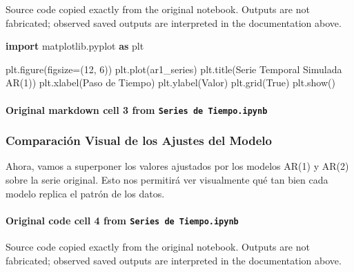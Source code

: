 \documentclass[
  11pt,
]{article}
\newenvironment{Shaded}{}{}
\newcommand{\DecValTok}[1]{\textcolor[rgb]{0.25,0.63,0.44}{#1}}
\newcommand{\ImportTok}[1]{\textcolor[rgb]{0.00,0.50,0.00}{\textbf{#1}}}
\newcommand{\NormalTok}[1]{#1}
\newcommand{\OperatorTok}[1]{\textcolor[rgb]{0.40,0.40,0.40}{#1}}
\newcommand{\StringTok}[1]{\textcolor[rgb]{0.25,0.44,0.63}{#1}}
\newcommand{\VariableTok}[1]{\textcolor[rgb]{0.10,0.09,0.49}{#1}}
\begin{document}
Source code copied exactly from the original notebook. Outputs are not fabricated; observed saved outputs are interpreted in the documentation above.

\begin{Shaded}
\begin{Highlighting}[]
\ImportTok{import}\NormalTok{ matplotlib.pyplot }\ImportTok{as}\NormalTok{ plt}

\NormalTok{plt.figure(figsize}\OperatorTok{=}\NormalTok{(}\DecValTok{12}\NormalTok{, }\DecValTok{6}\NormalTok{))}
\NormalTok{plt.plot(ar1\_series)}
\NormalTok{plt.title(}\StringTok{\textquotesingle{}Serie Temporal Simulada AR(1)\textquotesingle{}}\NormalTok{)}
\NormalTok{plt.xlabel(}\StringTok{\textquotesingle{}Paso de Tiempo\textquotesingle{}}\NormalTok{)}
\NormalTok{plt.ylabel(}\StringTok{\textquotesingle{}Valor\textquotesingle{}}\NormalTok{)}
\NormalTok{plt.grid(}\VariableTok{True}\NormalTok{)}
\NormalTok{plt.show()}
\end{Highlighting}
\end{Shaded}

\paragraph{\texorpdfstring{Original markdown cell 3 from \texttt{Series\ de\ Tiempo.ipynb}}{Original markdown cell 3 from Series de Tiempo.ipynb}}\label{original-markdown-cell-3-from-series-de-tiempoipynb}

\subsubsection{Comparación Visual de los Ajustes del Modelo}\label{comparaciuxf3n-visual-de-los-ajustes-del-modelo}

Ahora, vamos a superponer los valores ajustados por los modelos AR(1) y AR(2) sobre la serie original. Esto nos permitirá ver visualmente qué tan bien cada modelo replica el patrón de los datos.

\paragraph{\texorpdfstring{Original code cell 4 from \texttt{Series\ de\ Tiempo.ipynb}}{Original code cell 4 from Series de Tiempo.ipynb}}\label{original-code-cell-4-from-series-de-tiempoipynb}

Source code copied exactly from the original notebook. Outputs are not fabricated; observed saved outputs are interpreted in the documentation above.
\end{document}
